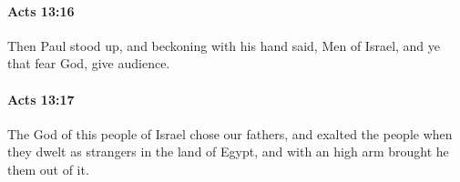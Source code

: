 		\paragraph{Acts 13:16} %
			\label{ACTS-13-16}

			Then Paul stood up, and beckoning with his hand said, Men of Israel, and ye that fear God, give audience.

			\begin{framed}
			\scriptsize
				\begin{compactdesc}
					\item[SBLG] 
				\end{compactdesc}
			\end{framed}

		\paragraph{Acts 13:17} %
			\label{ACTS-13-17}

			The God of this people of Israel chose our fathers, and exalted the people when they dwelt as strangers in the land of Egypt, and with an high arm brought he them out of it.

